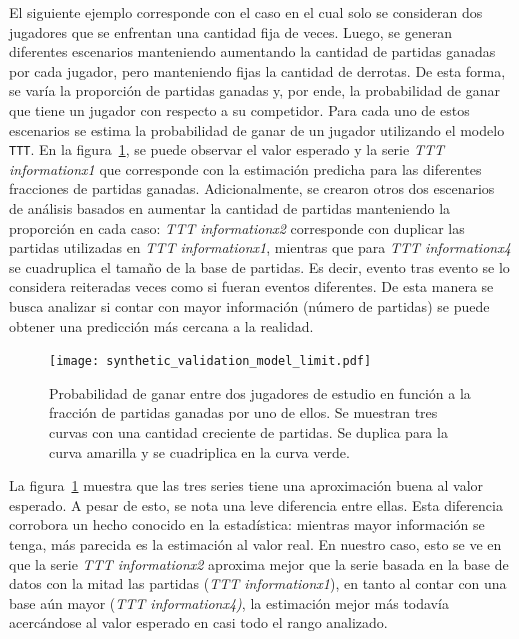 \documentclass[11pt,twoside,spanish]{report} %
\begin{document}
El siguiente ejemplo corresponde con el caso en el cual solo se consideran dos jugadores que se enfrentan una cantidad fija de veces.
Luego, se generan diferentes escenarios manteniendo aumentando la cantidad de partidas ganadas por cada jugador, pero manteniendo fijas la cantidad de derrotas.
De esta forma, se var\'ia la proporci\'on de partidas ganadas y, por ende, la probabilidad de ganar que tiene un jugador con respecto a su competidor.
Para cada uno de estos escenarios se estima la probabilidad de ganar de un jugador utilizando el modelo \texttt{TTT}.
En la figura~\ref{fig:limite}, se puede observar el valor esperado y la serie \emph{TTT informationx1} que corresponde con la estimaci\'on predicha para las diferentes fracciones de partidas ganadas.
Adicionalmente, se crearon otros dos escenarios de an\'alisis basados en aumentar la cantidad de partidas manteniendo la proporci\'on en cada caso: \emph{TTT informationx2} corresponde con duplicar las partidas utilizadas en \emph{TTT informationx1}, mientras que para \emph{TTT informationx4} se cuadruplica el tama\~no de la base de partidas.
Es decir, evento tras evento se lo considera reiteradas veces como si fueran eventos diferentes.
De esta manera se busca analizar si contar con mayor informaci\'on (n\'umero de partidas) se puede obtener una predicci\'on m\'as cercana a la realidad.

 \begin{figure}[H]
	\centering
	\texttt{[image: synthetic\_validation\_model\_limit.pdf]}
	\caption{Probabilidad de ganar entre dos jugadores de estudio en funci\'on a la fracci\'on de partidas ganadas por uno de ellos. 
	Se muestran tres curvas con una cantidad creciente de partidas. Se duplica para la curva amarilla y se cuadriplica en la curva verde.}
	\label{fig:limite}
\end{figure}

La figura~\ref{fig:limite} muestra que las tres series tiene una aproximaci\'on buena al valor esperado.
A pesar de esto, se nota una leve diferencia entre ellas. 
Esta diferencia corrobora un hecho conocido en la estad\'istica: mientras mayor informaci\'on se tenga, m\'as parecida es la estimaci\'on al valor real.
En nuestro caso, esto se ve en que la serie \emph{TTT informationx2} aproxima mejor que la serie basada en la base de datos con la mitad las partidas (\emph{TTT informationx1}), en tanto al contar con una base a\'un mayor (\emph{TTT informationx4)}, la estimaci\'on mejor m\'as todav\'ia acerc\'andose al valor esperado en casi todo el rango analizado.
\end{document}
